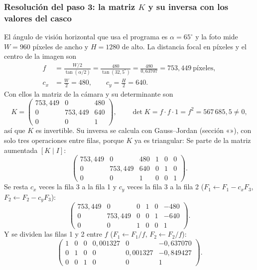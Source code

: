 \subsubsection{Resolución del paso 3: la matriz $K$ y su inversa con los valores del casco}\label{sec:casco-camara}

El ángulo de visión horizontal que usa el programa es $\alpha=65^\circ$ y la foto mide $W=960$ píxeles de ancho
y $H=1280$ de alto. La distancia focal en píxeles y el centro de la imagen son
\begin{align*}
f &= \frac{W/2}{\tan(\alpha/2)}=\frac{480}{\tan(32{,}5^\circ)}=\frac{480}{0{,}63707}=753{,}449\ \text{píxeles},\\
c_x&=\frac{W}{2}=480,\qquad c_y=\frac{H}{2}=640 .
\end{align*}
Con ellos la matriz de la cámara y su determinante son
\begin{equation}
K=\begin{pmatrix} 753{,}449 & 0 & 480 \\ 0 & 753{,}449 & 640 \\ 0 & 0 & 1 \end{pmatrix},\qquad \det K=f\cdot f\cdot1=f^2=567\,685{,}5\neq0,
\end{equation}
así que $K$ es invertible. Su inversa se calcula con Gauss--Jordan (sección «»), con solo tres
operaciones entre filas, porque $K$ ya es triangular:
Se parte de la matriz aumentada $[K\mid I]$:
\begin{equation*}
\left(\begin{array}{ccc|ccc} 753{,}449 & 0 & 480 & 1 & 0 & 0\\ 0 & 753{,}449 & 640 & 0 & 1 & 0\\ 0&0&1&0&0&1\end{array}\right).
\end{equation*}
Se resta $c_x$ veces la fila 3 a la fila 1 y $c_y$ veces la fila 3 a la fila 2 ($F_1\leftarrow F_1-c_xF_3$, $F_2\leftarrow F_2-c_yF_3$):
\begin{equation*}
\left(\begin{array}{ccc|ccc} 753{,}449 & 0 & 0 & 1 & 0 & -480\\ 0 & 753{,}449 & 0 & 0 & 1 & -640\\ 0&0&1&0&0&1\end{array}\right).
\end{equation*}
Y se dividen las filas 1 y 2 entre $f$ ($F_1\leftarrow F_1/f$, $F_2\leftarrow F_2/f$):
\begin{equation*}
\left(\begin{array}{ccc|ccc} 1&0&0& 0{,}001327 & 0 & -0{,}637070\\ 0&1&0& 0 & 0{,}001327 & -0{,}849427\\ 0&0&1&0&0&1\end{array}\right).
\end{equation*}
